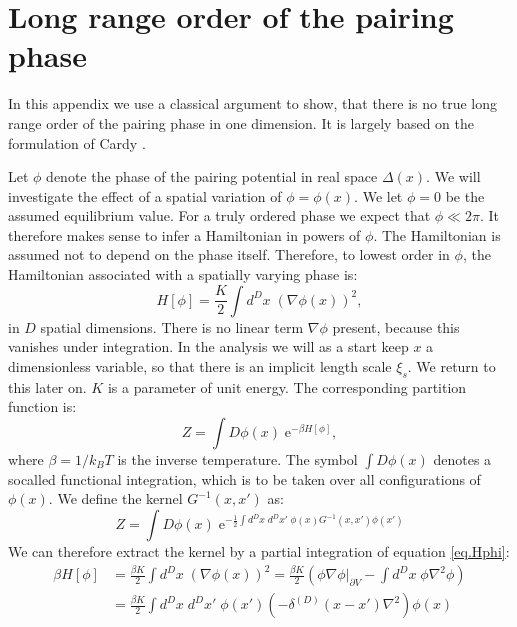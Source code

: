 
\chapter{Long range order of the pairing phase} %

\label{Appendix.longrangeorder.pairingphase} %
\chead{}
In this appendix we use a classical argument to show, that there is no true long range order of the pairing phase in one dimension. It is largely based on the formulation of Cardy \cite{Cardy.StatPhys}. 

Let $\phi$ denote the phase of the pairing potential in real space $\Delta(x)$. We will investigate the effect of a spatial variation of $\phi = \phi(x)$. We let $\phi = 0$ be the assumed equilibrium value. For a truly ordered phase we expect that $\phi \ll 2\pi$. It therefore makes sense to infer a Hamiltonian in powers of $\phi$. The Hamiltonian is assumed not to depend on the phase itself. Therefore, to lowest order in $\phi$, the Hamiltonian associated with a spatially varying phase is: 
\begin{equation}
H[\phi] = \frac{K}{2}\int d^{D}x \; \left(\nabla \phi(x)\right)^2, 
\label{eq.Hphi}
\end{equation}
in $D$ spatial dimensions. There is no linear term $\nabla \phi$ present, because this vanishes under integration. In the analysis we will as a start keep $x$ a dimensionless variable, so that there is an implicit length scale $\xi_s$. We return to this later on. $K$ is a parameter of unit energy. The corresponding partition function is: 
\begin{equation}
Z = \int D\phi(x) \; \text{e}^{-\beta H[\phi]}, 
\label{eq.partitionfunction}
\end{equation}
where $\beta = 1 / k_BT$ is the inverse temperature. The symbol $\int D\phi(x)$ denotes a socalled functional integration, which is to be taken over all configurations of $\phi(x)$. We define the kernel $G^{-1}(x,x')$ as: 
\begin{equation}
Z = \int D\phi(x)\; \text{e}^{-\frac{1}{2}\int d^{D}x\; d^{D}x' \; \phi(x)G^{-1}(x,x')\phi(x')} \nonumber
\end{equation}
We can therefore extract the kernel by a partial integration of equation \eqref{eq.Hphi}: 
\begin{align}
\beta H[\phi] &= \frac{\beta K}{2}\int d^{D}x \; \left(\nabla \phi(x)\right)^2 = \frac{\beta K}{2}\left( \left.\phi\nabla\phi\right|_{\partial V} - \int d^{D}x \; \phi \nabla^2\phi \right) \nonumber \\
&= \frac{\beta K}{2}\int d^{D}x\; d^{D}x'\; \phi(x')\left(-\delta^{(D)}(x - x')\nabla^2\right)\phi(x) \nonumber 
\end{align}
